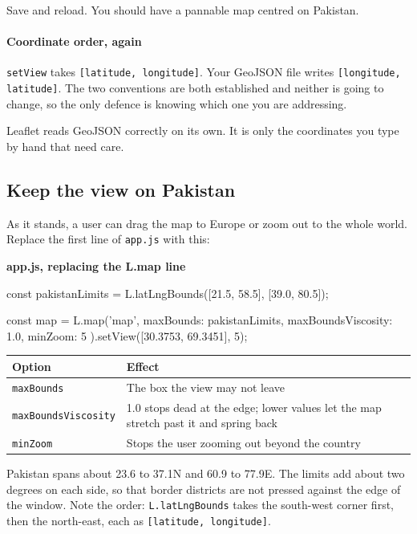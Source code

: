 \documentclass{article}
\newcommand{\cd}[1]{\texttt{#1}}
\newcommand{\codecap}[1]{%
  \par\vspace{.9em}\noindent\textbf{#1}\par\vspace{-.6em}}
\begin{document}
Save and reload. You should have a pannable map centred on Pakistan.

\paragraph{Coordinate order, again}
\cd{setView} takes \cd{[latitude, longitude]}. Your GeoJSON file writes
\cd{[longitude, latitude]}. The two conventions are both established and
neither is going to change, so the only defence is knowing which one you
are addressing.

Leaflet reads GeoJSON correctly on its own. It is only the coordinates
you type by hand that need care.


\subsection{Keep the view on Pakistan}

As it stands, a user can drag the map to Europe or zoom out to the whole
world. Replace the first line of \cd{app.js} with this:

\codecap{app.js, replacing the L.map line}
\begin{code}
const pakistanLimits = L.latLngBounds([21.5, 58.5], [39.0, 80.5]);

const map = L.map('map', {
  maxBounds: pakistanLimits,
  maxBoundsViscosity: 1.0,
  minZoom: 5
}).setView([30.3753, 69.3451], 5);
\end{code}

\begin{tabularx}{\textwidth}{@{}L{4.2cm} X@{}}
\toprule
\textbf{Option} & \textbf{Effect} \\
\midrule
\cd{maxBounds}          & The box the view may not leave \\
\cd{maxBoundsViscosity} & 1.0 stops dead at the edge; lower values let the
                          map stretch past it and spring back \\
\cd{minZoom}            & Stops the user zooming out beyond the country \\
\bottomrule
\end{tabularx}

\vspace{.8em}
Pakistan spans about 23.6 to 37.1\textdegree N and 60.9 to
77.9\textdegree E. The limits add about two degrees on each side, so that
border districts are not pressed against the edge of the window. Note the
order: \cd{L.latLngBounds} takes the south-west corner first, then the
north-east, each as \cd{[latitude, longitude]}.
\end{document}

